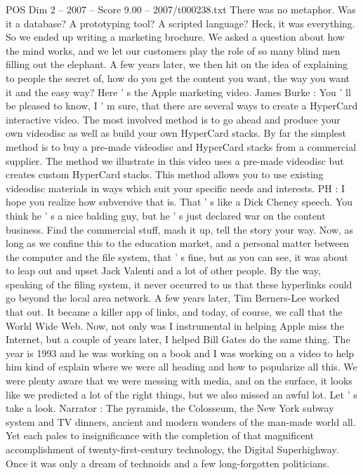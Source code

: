 \begin{textsample}{POS Dim 2 – 2007 – Score 9.00 – 2007/t000238.txt}
There was no metaphor.
Was it a database?
A prototyping tool?
A scripted language?
Heck, it was everything.
So we ended up writing a marketing brochure.
We asked a question about how the mind works, and we let our customers play the role of so many blind men filling out the elephant.
A few years later, we then hit on the idea of explaining to people the secret of, how do you get the content you want, the way you want it and the easy way?
Here ' s the Apple marketing video.
James Burke : You ' ll be pleased to know, I ' m sure, that there are several ways to create a HyperCard interactive video.
The most involved method is to go ahead and produce your own videodisc as well as build your own HyperCard stacks.
By far the simplest method is to buy a pre-made videodisc and HyperCard stacks from a commercial supplier.
The method we illustrate in this video uses a pre-made videodisc but creates custom HyperCard stacks.
This method allows you to use existing videodisc materials in ways which suit your specific needs and interests.
PH : I hope you realize how subversive that is.
That ' s like a Dick Cheney speech.
You think he ' s a nice balding guy, but he ' s just declared war on the content business.
Find the commercial stuff, mash it up, tell the story your way.
Now, as long as we confine this to the education market, and a personal matter between the computer and the file system, that ' s fine, but as you can see, it was about to leap out and upset Jack Valenti and a lot of other people.
By the way, speaking of the filing system, it never occurred to us that these hyperlinks could go beyond the local area network.
A few years later, Tim Berners-Lee worked that out.
It became a killer app of links, and today, of course, we call that the World Wide Web.
Now, not only was I instrumental in helping Apple miss the Internet, but a couple of years later, I helped Bill Gates do the same thing.
The year is 1993 and he was working on a book and I was working on a video to help him kind of explain where we were all heading and how to popularize all this.
We were plenty aware that we were messing with media, and on the surface, it looks like we predicted a lot of the right things, but we also missed an awful lot.
Let ' s take a look.
Narrator : The pyramids, the Colosseum, the New York subway system and TV dinners, ancient and modern wonders of the man-made world all.
Yet each pales to insignificance with the completion of that magnificent accomplishment of twenty-first-century technology, the Digital Superhighway.
Once it was only a dream of technoids and a few long-forgotten politicians.

\end{textsample}
